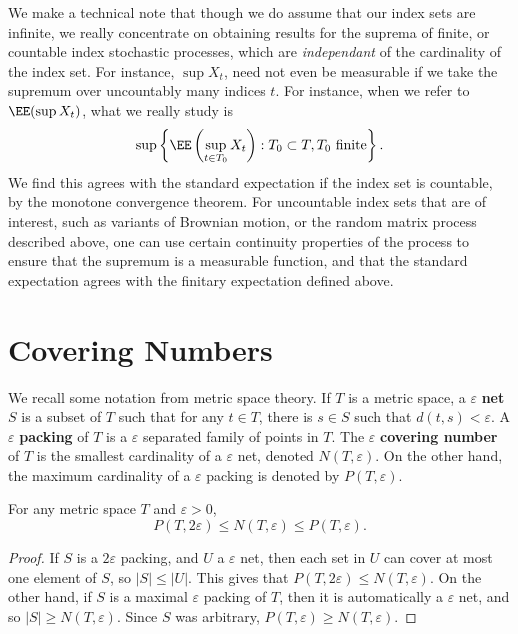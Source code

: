 We make a technical note that though we do assume that our index sets are infinite, we really concentrate on obtaining results for the suprema of finite, or countable index stochastic processes, which are \emph{independant} of the cardinality of the index set. For instance, $\sup X_t$, need not even be measurable if we take the supremum over uncountably many indices $t$. For instance, when we refer to $\EE(\sup X_t)$, what we really study is
%
\[ \sup \left\{ \EE \left( \sup_{t \in T_0} X_t \right): T_0 \subset T, T_0\ \text{finite} \right\}. \]
%
We find this agrees with the standard expectation if the index set is countable, by the monotone convergence theorem. For uncountable index sets that are of interest, such as variants of Brownian motion, or the random matrix process described above, one can use certain continuity properties of the process to ensure that the supremum is a measurable function, and that the standard expectation agrees with the finitary expectation defined above.

\section{Covering Numbers}

We recall some notation from metric space theory. If $T$ is a metric space, a $\varepsilon$ \textbf{net} $S$ is a subset of $T$ such that for any $t \in T$, there is $s \in S$ such that $d(t,s) < \varepsilon$. A $\varepsilon$ \textbf{packing} of $T$ is a $\varepsilon$ separated family of points in $T$. The $\varepsilon$ \textbf{covering number} of $T$ is the smallest cardinality of a $\varepsilon$ net, denoted $N(T,\varepsilon)$. On the other hand, the maximum cardinality of a $\varepsilon$ packing is denoted by $P(T,\varepsilon)$.

\begin{lemma}
	For any metric space $T$ and $\varepsilon > 0$,
	\[ P(T,2\varepsilon) \leq N(T,\varepsilon) \leq P(T,\varepsilon). \]
\end{lemma}
\begin{proof}
	If $S$ is a $2\varepsilon$ packing, and $U$ a $\varepsilon$ net, then each set in $U$ can cover at most one element of $S$, so $|S| \leq |U|$. This gives that $P(T,2\varepsilon) \leq N(T,\varepsilon)$. On the other hand, if $S$ is a maximal $\varepsilon$ packing of $T$, then it is automatically a $\varepsilon$ net, and so $|S| \geq N(T,\varepsilon)$. Since $S$ was arbitrary, $P(T,\varepsilon) \geq N(T,\varepsilon)$.
\end{proof}

